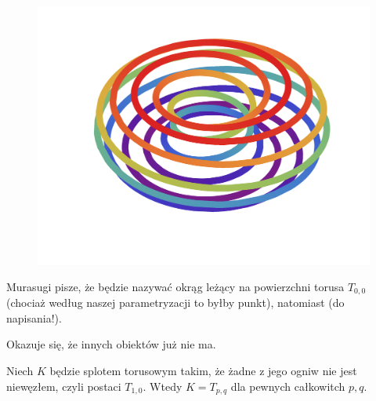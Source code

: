 \begin{figure}[H]
\begin{minipage}[b]{.3\linewidth}
        \centering
        \includegraphics[width=\linewidth]{../data/torus-p11-q2.pdf}
    \end{minipage}
\end{figure}

Murasugi \cite[s. 135]{murasugi96} pisze, że będzie nazywać okrąg leżący na powierzchni torusa $T_{0, 0}$ (chociaż według naszej parametryzacji to byłby punkt), natomiast (do napisania!).


Okazuje się, że innych obiektów już nie ma.

\begin{proposition}
    Niech $K$ będzie splotem torusowym takim, że żadne z jego ogniw nie jest niewęzłem, czyli postaci $T_{1, 0}$.
    Wtedy $K = T_{p, q}$ dla pewnych całkowitch $p, q$.
\end{proposition}

